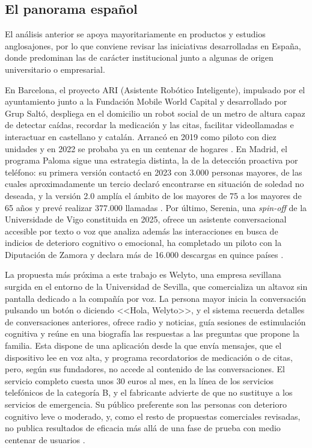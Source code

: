 \subsection{El panorama español}

El análisis anterior se apoya mayoritariamente en productos y estudios anglosajones, por lo que conviene revisar las iniciativas desarrolladas en España, donde predominan las de carácter institucional junto a algunas de origen universitario o empresarial.

En Barcelona, el proyecto ARI (Asistente Robótico Inteligente), impulsado por el ayuntamiento junto a la Fundación Mobile World Capital y desarrollado por Grup Saltó, despliega en el domicilio un robot social de un metro de altura capaz de detectar caídas, recordar la medicación y las citas, facilitar videollamadas e interactuar en castellano y catalán. Arrancó en 2019 como piloto con diez unidades y en 2022 se probaba ya en un centenar de hogares \citep{ARIBarcelona}. En Madrid, el programa Paloma sigue una estrategia distinta, la de la detección proactiva por teléfono: su primera versión contactó en 2023 con 3.000 personas mayores, de las cuales aproximadamente un tercio declaró encontrarse en situación de soledad no deseada, y la versión 2.0 amplía el ámbito de los mayores de 75 a los mayores de 65 años y prevé realizar 377.000 llamadas \citep{Paloma2026}. Por último, Serenia, una \textit{spin-off} de la Universidade de Vigo constituida en 2025, ofrece un asistente conversacional accesible por texto o voz que analiza además las interacciones en busca de indicios de deterioro cognitivo o emocional, ha completado un piloto con la Diputación de Zamora y declara más de 16.000 descargas en quince países \citep{Serenia2025}.

La propuesta más próxima a este trabajo es Welyto, una empresa sevillana surgida en el entorno de la Universidad de Sevilla, que comercializa un altavoz sin pantalla dedicado a la compañía por voz. La persona mayor inicia la conversación pulsando un botón o diciendo <<Hola, Welyto>>, y el sistema recuerda detalles de conversaciones anteriores, ofrece radio y noticias, guía sesiones de estimulación cognitiva y reúne en una biografía las respuestas a las preguntas que propone la familia. Esta dispone de una aplicación desde la que envía mensajes, que el dispositivo lee en voz alta, y programa recordatorios de medicación o de citas, pero, según sus fundadores, no accede al contenido de las conversaciones. El servicio completo cuesta unos 30 euros al mes, en la línea de los servicios telefónicos de la categoría B, y el fabricante advierte de que no sustituye a los servicios de emergencia. Su público preferente son las personas con deterioro cognitivo leve o moderado, y, como el resto de propuestas comerciales revisadas, no publica resultados de eficacia más allá de una fase de prueba con medio centenar de usuarios \citep{WelytoWeb,Welyto2026}.

